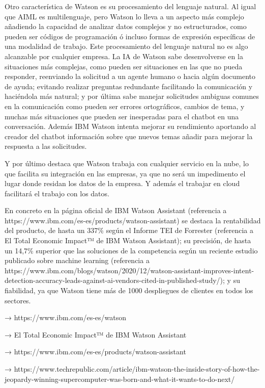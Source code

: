 Otro característica de Watson es su procesamiento del lenguaje natural. Al igual que AIML es multilenguaje, pero Watson lo lleva a un aspecto más complejo añadiendo la capacidad de analizar datos complejos y no estructurados, como pueden ser códigos de programación ó incluso formas de expresión específicas de una modalidad de trabajo. Este procesamiento del lenguaje natural no es algo alcanzable por cualquier empresa. La IA de Watson sabe desenvolverse en la situaciones más complejas, como pueden ser situaciones en las que no pueda responder, reenviando la solicitud a un agente humano o hacia algún documento de ayuda; evitando realizar preguntas redundante facilitando la comunicación y haciéndola más natural; y por última sabe manejar solicitudes ambiguas comunes en la comunicación como pueden ser errores ortográficos, cambios de tema, y muchas más situaciones que pueden ser inesperadas para el chatbot en una conversación. Además IBM Watson intenta mejorar su rendimiento aportando al creador del chatbot información sobre que nuevos temas añadir para mejorar la respuesta a las solicitudes.

Y por último destaca que Watson trabaja con cualquier servicio en la nube, lo que facilita su integración en las empresas, ya que no será un impedimento el lugar donde residan los datos de la empresa. Y además el trabajar en cloud facilitará el trabajo con los datos.

En concreto en la página oficial de IBM Watson Assistant (referencia a https://www.ibm.com/es-es/products/watson-assistant) se destaca la rentabilidad del producto, de hasta un 337\% según el Informe TEI de Forrester (referencia a El Total Economic Impact™ de IBM Watson Assistant); su precisión, de hasta un 14,7\% superior que las soluciones de la competencia según un reciente estudio publicado sobre machine learning (referencia a https://www.ibm.com/blogs/watson/2020/12/watson-assistant-improves-intent-detection-accuracy-leads-against-ai-vendors-cited-in-published-study/); y su fiabilidad, ya que Watson tiene más de 1000 despliegues de clientes en todos los sectores.



→ https://www.ibm.com/es-es/watson

→ El Total Economic Impact™ de IBM Watson Assistant

→ https://www.ibm.com/es-es/products/watson-assistant

→ https://www.techrepublic.com/article/ibm-watson-the-inside-story-of-how-the-jeopardy-winning-supercomputer-was-born-and-what-it-wants-to-do-next/

